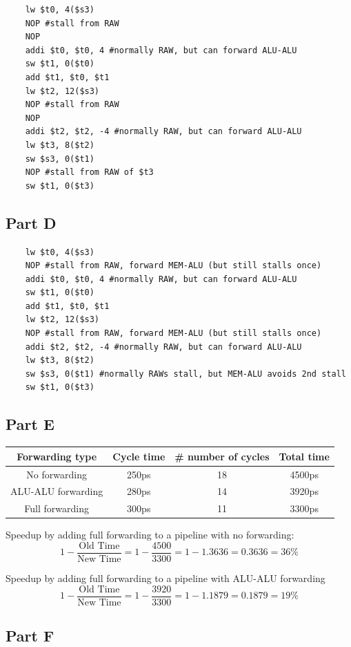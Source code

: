 \documentclass[11pt]{article} %
\begin{document}
\begin{verbatim}
    lw $t0, 4($s3)
    NOP #stall from RAW
    NOP
    addi $t0, $t0, 4 #normally RAW, but can forward ALU-ALU
    sw $t1, 0($t0)
    add $t1, $t0, $t1
    lw $t2, 12($s3)
    NOP #stall from RAW
    NOP
    addi $t2, $t2, -4 #normally RAW, but can forward ALU-ALU
    lw $t3, 8($t2)
    sw $s3, 0($t1)
    NOP #stall from RAW of $t3
    sw $t1, 0($t3)
\end{verbatim}

\subsection{Part D}

\begin{verbatim}
    lw $t0, 4($s3) 
    NOP #stall from RAW, forward MEM-ALU (but still stalls once)
    addi $t0, $t0, 4 #normally RAW, but can forward ALU-ALU
    sw $t1, 0($t0)
    add $t1, $t0, $t1
    lw $t2, 12($s3)
    NOP #stall from RAW, forward MEM-ALU (but still stalls once)
    addi $t2, $t2, -4 #normally RAW, but can forward ALU-ALU
    lw $t3, 8($t2)
    sw $s3, 0($t1) #normally RAWs stall, but MEM-ALU avoids 2nd stall
    sw $t1, 0($t3)
\end{verbatim}

\subsection{Part E}

\begin{tabular}{c|c|c|c}
Forwarding type & Cycle time & \# number of cycles & Total time\\\hline
No forwarding & 250ps & 18 & 4500ps \\
ALU-ALU forwarding & 280ps & 14 & 3920ps \\
Full forwarding & 300ps & 11 & 3300ps
\end{tabular}

\vspace{5mm}
Speedup by adding full forwarding to a pipeline with no forwarding:
\[
	1 - \frac{\text{Old Time}}{\text{New Time}} = 1 - \frac{4500}{3300} = 1 - 1.3636 = 0.3636 = 36\%
\]

Speedup by adding full forwarding to a pipeline with ALU-ALU forwarding
\[
	1 - \frac{\text{Old Time}}{\text{New Time}} = 1 - \frac{3920}{3300} = 1 - 1.1879 = 0.1879 = 19\%
\]

\subsection{Part F}
\end{document}
